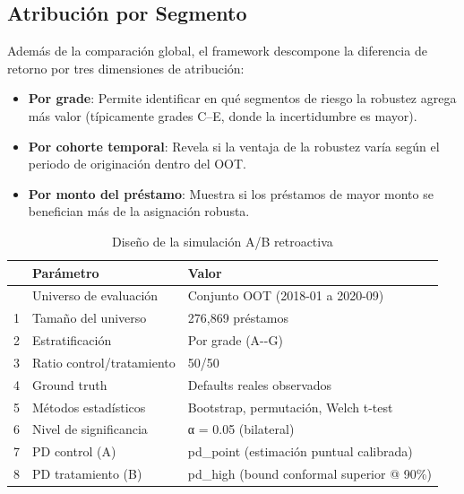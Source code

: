 \documentclass[
  spanish,
  11pt,
  letterpaper,
]{scrbook}
\providecommand{\tightlist}{%
  \setlength{\itemsep}{0pt}\setlength{\parskip}{0pt}}
\theoremstyle{plain}
\theoremstyle{remark}
\begin{document}
\subsection{Atribución por Segmento}\label{atribuciuxf3n-por-segmento}

Además de la comparación global, el framework descompone la diferencia
de retorno por tres dimensiones de atribución:

\begin{itemize}
\tightlist
\item
  \textbf{Por grade}: Permite identificar en qué segmentos de riesgo la
  robustez agrega más valor (típicamente grades C--E, donde la
  incertidumbre es mayor).
\item
  \textbf{Por cohorte temporal}: Revela si la ventaja de la robustez
  varía según el periodo de originación dentro del OOT.
\item
  \textbf{Por monto del préstamo}: Muestra si los préstamos de mayor
  monto se benefician más de la asignación robusta.
\end{itemize}

{

\begin{longtable}[]{@{}lll@{}}

\caption{\label{tbl-ab-design-summary}Diseño de la simulación A/B
retroactiva}

\tabularnewline

\toprule\noalign{}
& Parámetro & Valor \\
\midrule\noalign{}
\endhead
\bottomrule\noalign{}
\endlastfoot
0 & Universo de evaluación & Conjunto OOT (2018-01 a 2020-09) \\
1 & Tamaño del universo & 276,869 préstamos \\
2 & Estratificación & Por grade (A-\/-G) \\
3 & Ratio control/tratamiento & 50/50 \\
4 & Ground truth & Defaults reales observados \\
5 & Métodos estadísticos & Bootstrap, permutación, Welch t-test \\
6 & Nivel de significancia & α = 0.05 (bilateral) \\
7 & PD control (A) & pd\_point (estimación puntual calibrada) \\
8 & PD tratamiento (B) & pd\_high (bound conformal superior @ 90\%) \\

\end{longtable}

}
\end{document}
